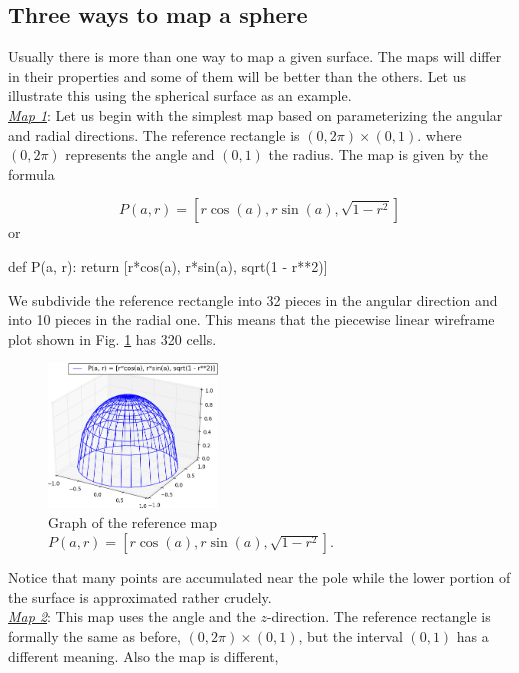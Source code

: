\subsection{Three ways to map a sphere}

Usually there is more than one way to 
map a given surface. The maps will differ in their properties 
and some of them will be better than the others. Let us
illustrate this using the spherical surface as an example. \\

\noindent
\underline{\em Map 1}: Let us begin with the simplest map based on parameterizing 
the angular and radial directions. The reference rectangle is $(0, 2\pi)\times(0, 1)$. 
where $(0, 2\pi)$ represents the angle and $(0, 1)$ the radius. The map is given by the formula

$$
P(a, r) = \left[r\cos(a), r\sin(a), \sqrt{1 - r^2}\right]
$$
or

\begin{bbox}
def P(a, r):
    return [r*cos(a), r*sin(a), sqrt(1 - r**2)]
\end{bbox}
We subdivide the reference rectangle into 32 pieces in the angular direction
and into 10 pieces in the radial one. This means that the piecewise linear 
wireframe plot shown in Fig. \ref{fig:paramsu5} has 320 cells. 
\newpage

\begin{figure}[!ht]
\begin{center}
\includegraphics[width=0.4\textwidth]{img/paramsu5.png}
\end{center}
\vspace{-6mm}
\caption{Graph of the reference map $P(a, r) = \left[r\cos(a), r\sin(a), \sqrt{1 - r^2}\right]$.}
\label{fig:paramsu5}
\end{figure}
\noindent
Notice that many points are accumulated near the pole while the lower portion
of the surface is approximated rather crudely. \\

\noindent
\underline{\em Map 2}: This map uses the angle and the $z$-direction. The 
reference rectangle is formally the same as before, $(0, 2\pi)\times(0, 1)$,
but the interval $(0, 1)$ has a different meaning. Also the map is different,

